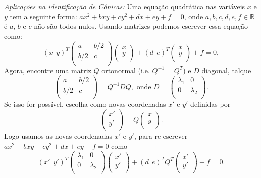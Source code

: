 \documentclass[10pt]{article}
\theoremstyle{plain}
\theoremstyle{obs}
\numberwithin{equation}{section}
\begin{document}
 {\it Aplicações na identificação de Cônicas:}
 Uma equação quadrática nas variáveis $x$ e $y$
 tem a seguinte forma:
 $ ax^{2}+bxy+cy^{2}+dx+ey+f=0$,
 onde $a,b,c,d,e,f \in \mathbb{R}$ é $a$, $b$ e $c$ não são todos nulos.
 Usando matrizes podemos escrever essa equação como:
 $$
 (x \ \ y)^{T}
 \begin{pmatrix}
a & b/2  \\%
b/2 & c \\
\end{pmatrix}
\begin{pmatrix}
x \\
y \\
\end{pmatrix}+
(d \ \ e)^{T}
\begin{pmatrix}
x \\
y \\
\end{pmatrix}+f=0,$$
Agora, encontre uma matriz $Q$ ortonormal (i.e. $Q^{-1}=Q^{T}$)  e  $D$ diagonal, talque
$$ \begin{pmatrix}
a & b/2  \\%
b/2 & c \\
\end{pmatrix}=Q^{-1}DQ, \text{ onde } 
D=
\begin{pmatrix}
\lambda_1 & 0  \\%
0 & \lambda_2 \\
\end{pmatrix}.$$
Se isso for possível, escolha como novas coordenadas $x'$ e $y'$ 
definidas por 
$$
 \begin{pmatrix}
x' \\%
y' \\
\end{pmatrix}=Q
\begin{pmatrix}
x \\
y \\
\end{pmatrix}.$$
Logo usamos as novas coordenadas $x'$ e $y'$, para re-escrever 
$ ax^{2}+bxy+cy^{2}+dx+ey+f=0$ como 
$$
 (x' \ \ y')^{T}
 \begin{pmatrix}
\lambda_1 & 0  \\%
0 & \lambda_2 \\
\end{pmatrix}
\begin{pmatrix}
x' \\
y' \\
\end{pmatrix}+
(d \ \ e)^{T}
Q^{T}
\begin{pmatrix}
x' \\
y' \\
\end{pmatrix}+f=0.$$
\end{document}
